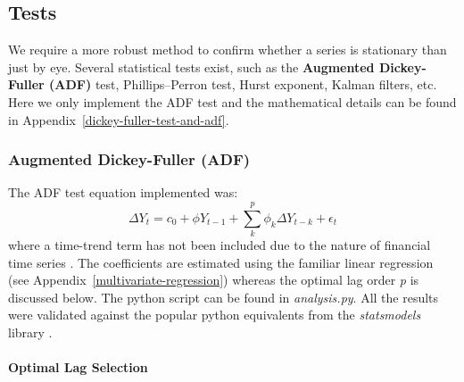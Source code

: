 \documentclass[11pt]{article}
\begin{document}
    \begin{center}
    \end{center}
    
    
    \subsection{Tests}\label{tests}
    
    
    We require a more robust method to confirm  whether a
series is stationary than just by eye. Several statistical tests exist, such as the \textbf{Augmented
Dickey-Fuller (ADF)} test, Phillips--Perron test, Hurst exponent, Kalman
filters, etc.
Here we only implement the ADF test and the mathematical details can be
found in Appendix~\ref{dickey-fuller-test-and-adf}.

    \subsubsection{Augmented Dickey-Fuller (ADF) }\label{adf-test-implementation}
    
The ADF test equation implemented was: \begin{equation}
\Delta Y_t = c_0 + \phi Y_{t-1} + \sum^p_k \phi_k \Delta Y_{t-k} + \epsilon_t 
\end{equation} where a time-trend term has not been included due to the nature of
financial time series \cite{refmissing}. The coefficients are
estimated using the familiar linear regression (see Appendix~\ref{multivariate-regression}) whereas
the optimal lag order \emph{p} is discussed below. The python script can
be found in \emph{analysis.py}. All the results were validated against
the popular python equivalents from the
{\em statsmodels} library \cite{statsmodelslibrary}.


    \paragraph{Optimal Lag Selection}\label{optimal-lag-selection}
    
\end{document}
